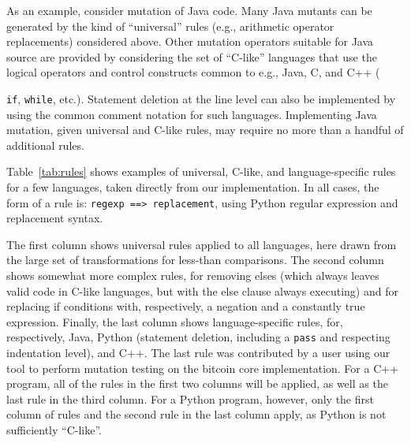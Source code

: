 \documentclass[sigconf,review, anonymous]{acmart}
\begin{document}
As an
example, consider mutation of Java code.  Many Java mutants can be
generated by the kind of ``universal'' rules (e.g., arithmetic
operator replacements) considered above.  Other mutation operators
suitable for Java source are provided by considering the set of
``C-like'' languages that use the logical operators and control
constructs common to e.g.,  Java, C, and C++ ({{\tt if}, {\tt while},
  etc.).  Statement deletion at the line level can also be implemented
  by using the common comment notation for such languages.
  Implementing Java mutation, given universal and C-like rules, may
  require no more than a handful of additional rules.

\begin{table}[hbtp]
\centering
\caption{Rule Examples}
\label{tab:rules}

\end{table}
  
  
  Table~\ref{tab:rules} shows examples of universal, C-like, and
  language-specific rules for a few languages, taken directly from our
  implementation.  In all cases, the form of a rule is: {\tt regexp
    ==> replacement}, using Python regular expression and replacement syntax.

  The first column shows universal rules applied to
  all languages, here drawn from the large set of transformations for
  less-than comparisons.  The second column shows somewhat more
  complex rules, for removing elses (which always leaves valid code in
  C-like languages, but with the else clause always executing) and for
  replacing if conditions with, respectively, a negation and a
  constantly true expression.  Finally, the last column shows
  language-specific rules, for, respectively, Java, Python (statement
  deletion, including a {\tt pass} and respecting indentation level),
  and C++.  The last rule was contributed by a user using our tool to
  perform mutation testing on the bitcoin core implementation.  For a
  C++ program, all of the rules in the first two columns will be
  applied, as well as the last rule in the third column.  For a Python
  program, however, only the first column of rules and the second rule
  in the last column apply, as Python is not sufficiently ``C-like''.


}
\end{document}
